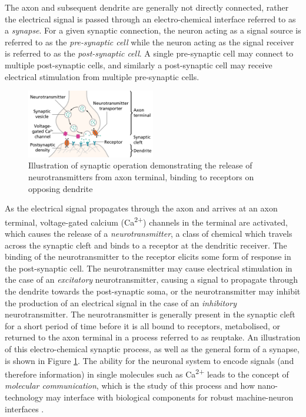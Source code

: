 \par

The axon and subsequent dendrite are generally not directly connected, rather the electrical signal is passed through an electro-chemical interface referred to as a \emph{synapse}. For a given synaptic connection, the neuron acting as a signal source is referred to as the \emph{pre-synaptic cell} while the neuron acting as the signal receiver is referred to as the \emph{post-synaptic cell}. A single pre-synaptic cell may connect to multiple post-synaptic cells, and similarly a post-synaptic cell may receive electrical stimulation from multiple pre-synaptic cells.
\begin{figure}
    \includegraphics[width=0.5\textwidth]{02-Background/synapse.png}
    \caption{Illustration of synaptic operation \cite{synapseAnnotated} demonstrating the release of neurotransmitters from axon terminal, binding to receptors on opposing dendrite  }
    \label{synapseOverview}
\end{figure}
As the electrical signal propagates through the axon and arrives at an axon terminal, voltage-gated calcium (Ca\textsuperscript{2+}) channels in the terminal are activated, which causes the release of a \emph{neurotransmitter}, a class of chemical which travels across the synaptic cleft and binds to a receptor at the dendritic receiver. The binding of the neurotransmitter to the receptor elicits some form of response in the post-synaptic cell. The neurotransmitter may cause electrical stimulation in the case of an \emph{excitatory} neurotransmitter, causing a signal to propagate through the dendrite towards the post-synaptic soma, or the neurotransmitter may inhibit the production of an electrical signal in the case of an \emph{inhibitory} neurotransmitter. The neurotransmitter is generally present in the synaptic cleft for a short period of time before it is all bound to receptors, metabolised, or returned to the axon terminal in a process referred to as reuptake.  An illustration of this electro-chemical synaptic process, as well as the general form of a synapse, is shown in Figure \ref{synapseOverview}. The ability for the neuronal system to encode signals (and therefore information) in single molecules such as Ca\textsuperscript{2+} leads to the concept of \emph{molecular communication}, which is the study of this process and how nano-technology may interface with biological components for robust machine-neuron interfaces \cite{mBarrosMolCom}.
\par

